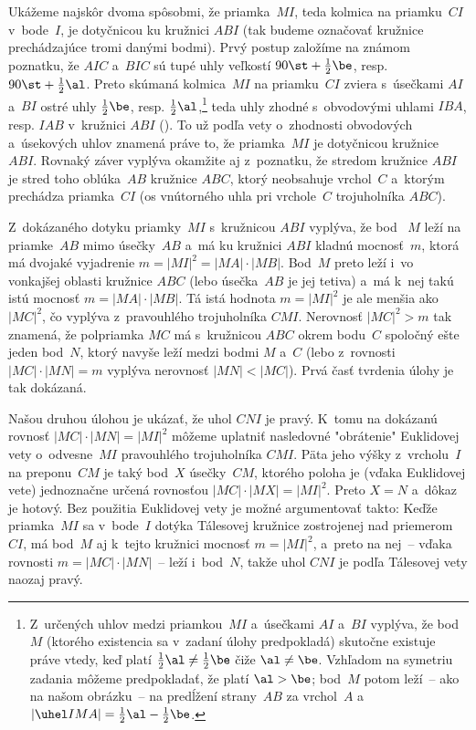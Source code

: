 {%
Ukážeme najskôr dvoma spôsobmi, že priamka~$MI$, teda
kolmica na priamku~$CI$ v~bode~$I$, je dotyčnicou ku kružnici
$ABI$ (tak budeme označovať kružnice prechádzajúce tromi danými bodmi).
Prvý postup založíme na známom poznatku, že
$AIC$ a~$BIC$ sú tupé uhly veľkostí $90\st+\frac12\be$, resp.
$90\st+\frac12\al$. Preto skúmaná kolmica~$MI$
na priamku~$CI$ zviera
s~úsečkami $AI$ a~$BI$ ostré uhly $\frac12\be$, resp.
$\frac12\al$,\footnote{Z~určených uhlov medzi priamkou~$MI$
a~úsečkami $AI$ a~$BI$ vyplýva, že bod~$M$ (ktorého existencia sa
v~zadaní úlohy predpokladá) skutočne existuje práve vtedy, keď platí
$\frac12\al\ne\frac12\be$ čiže $\al\ne\be$. Vzhľadom na
symetriu zadania môžeme predpokladať, že platí $\al>\be$; bod~$M$
potom leží~-- ako na našom obrázku~-- na predĺžení strany~$AB$ za
vrchol~$A$ a~$|\uhel IMA|=\frac12\al-\frac12\be$.}
teda uhly zhodné s~obvodovými uhlami $IBA$, resp.
$IAB$ v~kružnici $ABI$ (\obr).
To už podľa vety o~zhodnosti obvodových
a~úsekových uhlov znamená práve to, že priamka~$MI$ je dotyčnicou
kružnice~$ABI$. Rovnaký záver vyplýva okamžite aj z~poznatku, že
stredom kružnice $ABI$ je stred toho oblúka~$AB$ kružnice $ABC$, ktorý
neobsahuje vrchol~$C$ a~ktorým prechádza priamka~$CI$
(os vnútorného uhla pri vrchole~$C$ trojuholníka $ABC$).
%

Z~dokázaného dotyku priamky~$MI$ s~kružnicou $ABI$ vyplýva, že bod~
$M$ leží na priamke~$AB$ mimo úsečky~$AB$ a~má ku kružnici $ABI$
kladnú mocnosť~$m$, ktorá má dvojaké vyjadrenie $m=|MI|^2=|MA|\cdot|MB|$.
Bod~$M$ preto leží i~vo vonkajšej oblasti kružnice $ABC$ (lebo
úsečka~$AB$ je jej tetiva) a~má k~nej takú istú mocnosť $m=|MA|\cdot|MB|$.
Tá istá hodnota $m=|MI|^2$ je ale menšia ako $|MC|^2$, čo vyplýva
z~pravouhlého trojuholníka $CMI$. Nerovnosť $|MC|^2>m$ tak znamená, že polpriamka
$MC$ má s~kružnicou $ABC$ okrem bodu~$C$ spoločný ešte jeden bod~$N$, ktorý navyše leží medzi bodmi $M$ a~$C$  (lebo
z~rovnosti $|MC|\cdot|MN|=m$ vyplýva nerovnosť $|MN|<|MC|$).
Prvá časť tvrdenia úlohy je tak dokázaná.

Našou druhou úlohou je ukázať, že uhol $CNI$ je pravý. K~tomu na
dokázanú rovnosť $|MC|\cdot|MN|=|MI|^2$ môžeme uplatniť
nasledovné "obrátenie" Euklidovej vety o~odvesne~$MI$
pravouhlého trojuholníka $CMI$. Päta jeho výšky z~vrcholu~$I$ na preponu~$CM$
je taký bod~$X$ úsečky~$CM$, ktorého poloha je
(vďaka Euklidovej vete) jednoznačne určená rovnosťou
$|MC|\cdot|MX|=|MI|^2$. Preto $X=N$ a~dôkaz je hotový.
Bez použitia Euklidovej vety je možné argumentovať takto: Keďže priamka~$MI$ sa v~bode~$I$ dotýka Tálesovej kružnice zostrojenej nad
priemerom~$CI$, má bod~$M$ aj k~tejto kružnici mocnosť $m=|MI|^2$,
a~preto na nej~-- vďaka rovnosti $m=|MC|\cdot|MN|$~-- leží i~bod~$N$,
takže uhol $CNI$ je podľa Tálesovej vety naozaj pravý.

}
